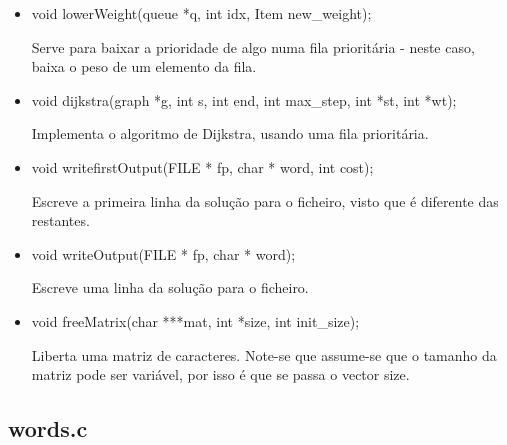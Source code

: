 \documentclass[a4paper, 11pt]{article}
\begin{document}
\begin{itemize}
    \item void lowerWeight(queue *q, int idx, Item new{\_}weight);
    \par Serve para baixar a prioridade de algo numa fila prioritária - neste caso, baixa o peso de um elemento da fila.
    
    \item void dijkstra(graph *g, int s, int end, int max{\_}step, int *st, int *wt);
    \par Implementa o algoritmo de Dijkstra, usando uma fila prioritária.
    
    \item void writefirstOutput(FILE * fp, char * word, int cost);
    \par Escreve a primeira linha da solução para o ficheiro, visto que é diferente das restantes.
    
    \item void writeOutput(FILE * fp, char * word);
    \par Escreve uma linha da solução para o ficheiro.
    
    \item void freeMatrix(char ***mat, int *size, int init{\_}size);
    \par Liberta uma matriz de caracteres. Note-se que assume-se que o tamanho da matriz pode ser variável, por isso é que se passa o vector size.
    \end{itemize}

\subsection{words.c}
\end{document}

